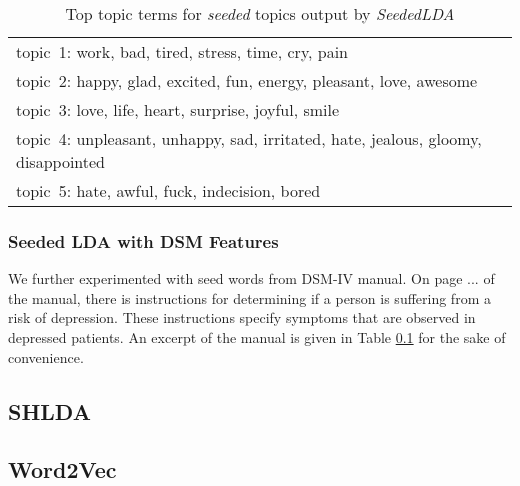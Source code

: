 \begin{table*} [ht!]
	\begin{tabular}{ l }
	\hline
{topic~1: work, bad, tired, stress, time, cry, pain}\\
{topic~2: happy, glad, excited, fun, energy, pleasant, love, awesome}\\
{topic~3: love, life, heart, surprise, joyful, smile}\\
{topic~4: unpleasant, unhappy, sad, irritated, hate, jealous, gloomy, disappointed }\\
{topic~5: hate, awful, fuck, indecision, bored}\\
\hline
    \end{tabular}
      \caption{\noindent Top topic terms for \textit{seeded} topics output by \textit{SeededLDA}}
        \label{table:seedwords_1}
\end{table*}

\subsubsection{Seeded LDA with DSM Features}

We further experimented with seed words from DSM-IV manual. On page ... of the manual, there is instructions for determining if a person is suffering from a risk of depression. These instructions specify symptoms that are observed in depressed patients. An excerpt of the manual is given in Table \ref{} for the sake of convenience. 




\subsection{SHLDA}
\subsection{Word2Vec}
\label{model}
